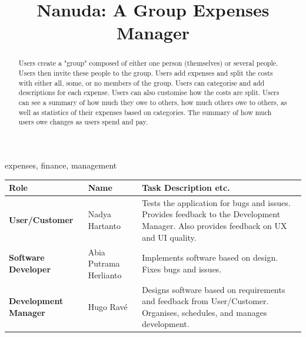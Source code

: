 \documentclass[conference]{IEEEtran}
\begin{document}
\title{Nanuda: A Group Expenses Manager}

\author{
\and
{}
\and
{}
}

\maketitle

\begin{abstract}
Users create a "group" composed of either one person (themselves) or several people. Users then invite these people to the group. Users add expenses and split the costs with either all, some, or no members of the group. Users can categorise and add descriptions for each expense. Users can also customise how the costs are split. Users can see a summary of how much they owe to others, how much others owe to others, as well as statistics of their expenses based on categories. The summary of how much users owe changes as users spend and pay.
\end{abstract}

\begin{IEEEkeywords}
expenses, finance, management
\end{IEEEkeywords}

\begin{center}
\begin{tabular}{|p{6em}|p{5em}|p{10em}|}
\hline
\textbf{Role} & \textbf{Name} & \textbf{Task Description etc.} \\
\hline
\textbf{User/Customer} & Nadya Hartanto & Tests the application for bugs and issues. Provides feedback to the Development Manager.
Also provides feedback on UX and UI quality. \\
\hline
\textbf{Software Developer} & Abia Putrama Herlianto & Implements software based on design. Fixes bugs and issues. \\
\hline
\textbf{Development Manager} & Hugo Ravé & Designs software based on requirements and feedback from User/Customer. Organises, schedules, and manages development. \\
\hline
\end{tabular}
\end{center}
\end{document}
